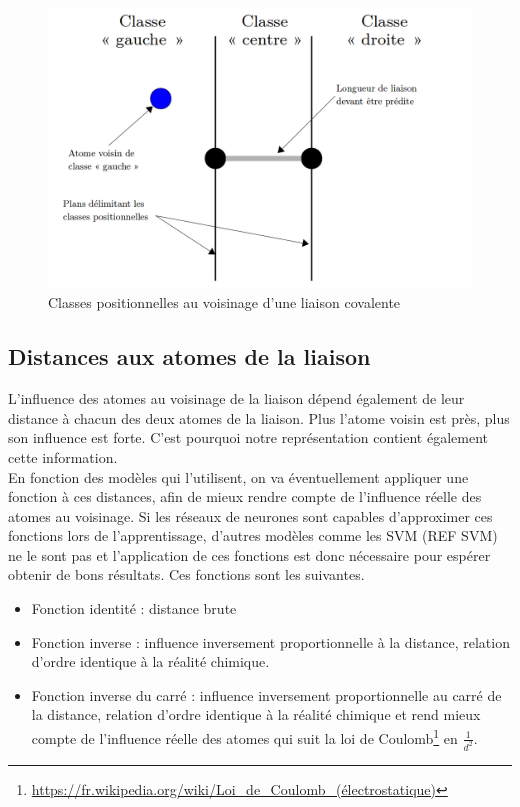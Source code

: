 \vspace{1cm}

\begin{figure}[!h]
	\centering
	\includegraphics[scale=0.3]{images/classes_pos.png}
	\caption{Classes positionnelles au voisinage d'une liaison covalente}
\end{figure}

\subsection{Distances aux atomes de la liaison}
\par L'influence des atomes au voisinage de la liaison dépend également de leur distance à chacun des deux atomes de la liaison. Plus l'atome voisin est près, plus son influence est forte. C'est pourquoi notre représentation contient également cette information. \\
En fonction des modèles qui l'utilisent, on va éventuellement appliquer une fonction à ces distances, afin de mieux rendre compte de l'influence réelle des atomes au voisinage. Si les réseaux de neurones sont capables d'approximer ces fonctions lors de l'apprentissage, d'autres modèles comme les SVM (REF SVM) ne le sont pas et l'application de ces fonctions est donc nécessaire pour espérer obtenir de bons résultats. Ces fonctions sont les suivantes.\\

\begin{itemize}
\item{Fonction identité : distance brute}
\item{Fonction inverse : influence inversement proportionnelle à la distance, relation d'ordre identique à la réalité chimique.}
\item{Fonction inverse du carré : influence inversement proportionnelle au carré de la distance, relation d'ordre identique à la réalité chimique et rend mieux compte de l'influence réelle des atomes qui suit la loi de Coulomb\footnote{\url{https://fr.wikipedia.org/wiki/Loi_de_Coulomb_(électrostatique)}} en $\frac{1}{d^2}$.}
\end{itemize}

